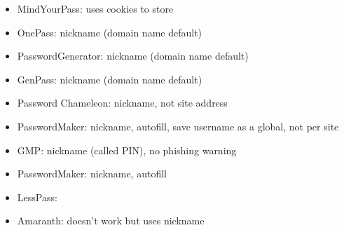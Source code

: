 \begin{itemize}
\item MindYourPass: uses cookies to store


\item OnePass: nickname  (domain name default)
 

\item PasswordGenerator: nickname (domain name default)
 

\item GenPass: nickname (domain name default)


\item Password Chameleon: nickname, not site address


\item PasswordMaker: nickname, autofill, save username as a global, not per site


\item GMP:  nickname (called PIN), no phishing warning


\item PasswordMaker: nickname, autofill


\item LessPass: 


\item Amaranth: doesn't work but uses nickname



\end{itemize}
